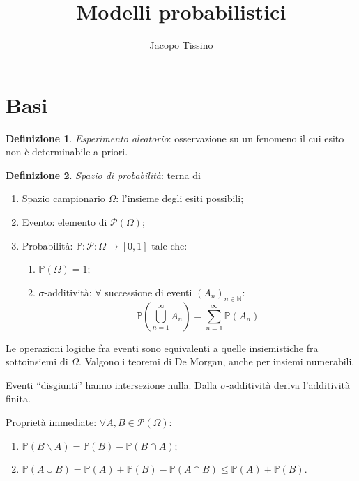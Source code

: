 \documentclass[12pt,a4paper]{article}
\author{Jacopo Tissino}
\title{Modelli probabilistici}
\numberwithin{equation}{section}
\theoremstyle{definition}
\newtheorem{definition}{Definizione}[section]
\theoremstyle{remark}
\begin{document}
\maketitle

\section{Basi}

\begin{definition}
\emph{Esperimento aleatorio}: osservazione su un fenomeno il cui esito non è determinabile a priori.
\end{definition}

\begin{definition}
\emph{Spazio di probabilità}: terna di 

\begin{enumerate}
\item Spazio campionario $\Omega$: l'insieme degli esiti possibili;
\item Evento: elemento di $\mathcal{P}(\Omega)$;
\item Probabilità: $\mathbb{P}: \mathcal{P}: \Omega \rightarrow [0, 1]$ tale che:
\begin{enumerate}
\item $\mathbb{P}(\Omega) = 1$;
\item $\sigma$-additività: $\forall$ successione di eventi $(A_n)_{n \in \mathbb{N}}$:
\begin{equation}
\mathbb{P}\left(\displaystyle \bigcup_{n=1}^\infty A_n \right) = \sum_{n=1}^\infty \mathbb{P} (A_n)
\end{equation}
\end{enumerate}
\end{enumerate}
\end{definition}

Le operazioni logiche fra eventi sono equivalenti a quelle insiemistiche fra sottoinsiemi di $\Omega$. Valgono i teoremi di De Morgan, anche per insiemi numerabili.

Eventi ``disgiunti'' hanno intersezione nulla. Dalla $\sigma$-additività deriva l'additività finita.

Proprietà immediate: $\forall A, B \in \mathcal{P} (\Omega)$:

\begin{enumerate}
\item $\mathbb{P}(B \smallsetminus A) = \mathbb{P}(B) - \mathbb{P}(B \cap A)$;
\item $\mathbb{P}(A \cup B) = \mathbb{P}(A) + \mathbb{P}(B) - \mathbb{P}(A \cap B) \leq \mathbb{P}(A) + \mathbb{P}(B)$.
\end{enumerate}
\end{document}

